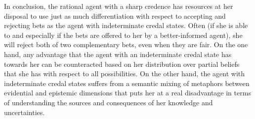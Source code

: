 In conclusion, the rational agent with a sharp credence has resources at her disposal to use just as much differentiation with respect to accepting and rejecting bets as the agent with indeterminate credal states. Often (if she is able to and especially if the bets are offered to her by a better-informed agent), she will reject both of two complementary bets, even when they are fair. On the one hand, any advantage that the agent with an indeterminate credal state has towards her can be counteracted based on her distribution over partial beliefs that she has with respect to all possibilities. On the other hand, the agent with indeterminate credal states suffers from a semantic mixing of metaphors between evidential and epistemic dimensions that puts her at a real disadvantage in terms of understanding the sources and consequences of her knowledge and uncertainties.
